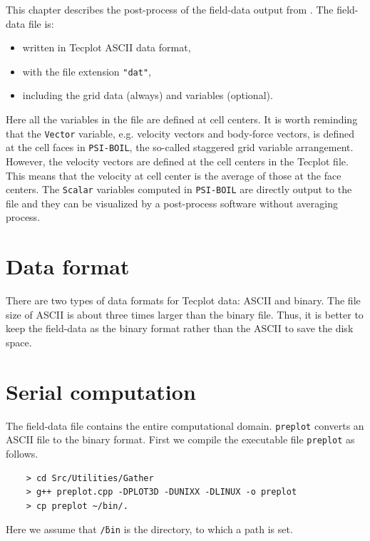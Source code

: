 \label{chap_post_process}

This chapter describes the post-process of the field-data output from {\psiboil}.
The field-data file is: 
    \begin{itemize}
	\item written in Tecplot ASCII data format,
	\item with the file extension {\tt "dat"},
	\item including the grid data (always) and variables (optional).
    \end{itemize}
Here all the variables in the file are defined at cell centers. It is worth reminding that the {\tt Vector} variable, e.g. velocity vectors and body-force vectors, is defined at the cell faces in {\tt PSI-BOIL}, the so-called staggered grid variable arrangement. However, the velocity vectors are defined at the cell centers in the Tecplot file. This means that the velocity at cell center is the average of those at the face centers. The {\tt Scalar} variables computed in {\tt PSI-BOIL} are directly output to the file and they can be visualized by a post-process software without averaging process.

\section{Data format}
\label{sec_data_format}
There are two types of data formats for Tecplot data: ASCII and binary. The file size of ASCII is about three times larger than the binary file. Thus, it is better to keep the field-data as the binary format rather than the ASCII to save the disk space.

\section{Serial computation}

The field-data file contains the entire computational domain. {\tt preplot} converts an ASCII file to the binary format. First we compile the executable file {\tt preplot} as follows.
\begin{verbatim}
	> cd Src/Utilities/Gather 
	> g++ preplot.cpp -DPLOT3D -DUNIXX -DLINUX -o preplot
	> cp preplot ~/bin/.
\end{verbatim}
Here we assume that {\tt \~/bin} is the directory, to which a path is set. 

